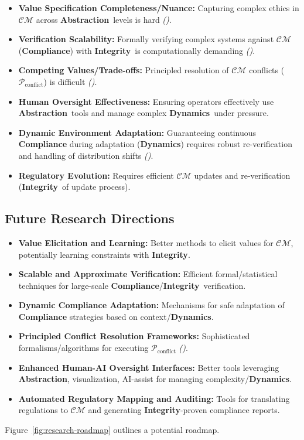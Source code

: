 \documentclass[12pt,a4paper]{report}
\renewcommand{\citep}[1]{\textit{\scriptsize{(\cite{#1})}}}
\newcommand{\Integrity}{\textbf{Integrity}}
\newcommand{\Abstraction}{\textbf{Abstraction}}
\newcommand{\Dynamics}{\textbf{Dynamics}}
\begin{document}
	\begin{itemize}
		\item \textbf{Value Specification Completeness/Nuance:} Capturing complex ethics in $\mathcal{CM}$ across \Abstraction\ levels is hard \citep{Kovac2025SpecGaming}.
		\item \textbf{Verification Scalability:} Formally verifying complex systems against $\mathcal{CM}$ (\textbf{Compliance}) with \Integrity\ is computationally demanding \citep{Peng2025ZKMLSurvey}.
		\item \textbf{Competing Values/Trade-offs:} Principled resolution of $\mathcal{CM}$ conflicts ($\mathcal{P}_{\text{conflict}}$) is difficult \citep{Sekrst2024Guardrails}.
		\item \textbf{Human Oversight Effectiveness:} Ensuring operators effectively use \Abstraction\ tools and manage complex \Dynamics\ under pressure.
		\item \textbf{Dynamic Environment Adaptation:} Guaranteeing continuous \textbf{Compliance} during adaptation (\Dynamics) requires robust re-verification and handling of distribution shifts \citep{AdditionalCitationRef53}.
		\item \textbf{Regulatory Evolution:} Requires efficient $\mathcal{CM}$ updates and re-verification (\Integrity\ of update process).
	\end{itemize}
	
	\subsection{Future Research Directions} %
	\label{sec:5-8-2} %
	
	\begin{itemize}
		\item \textbf{Value Elicitation and Learning:} Better methods to elicit values for $\mathcal{CM}$, potentially learning constraints with \Integrity.
		\item \textbf{Scalable and Approximate Verification:} Efficient formal/statistical techniques for large-scale \textbf{Compliance}/\Integrity\ verification.
		\item \textbf{Dynamic Compliance Adaptation:} Mechanisms for safe adaptation of \textbf{Compliance} strategies based on context/\Dynamics.
		\item \textbf{Principled Conflict Resolution Frameworks:} Sophisticated formalisms/algorithms for executing $\mathcal{P}_{\text{conflict}}$ \citep{Sekrst2024Guardrails}.
		\item \textbf{Enhanced Human-AI Oversight Interfaces:} Better tools leveraging \Abstraction, visualization, AI-assist for managing complexity/\Dynamics.
		\item \textbf{Automated Regulatory Mapping and Auditing:} Tools for translating regulations to $\mathcal{CM}$ and generating \Integrity-proven compliance reports.
	\end{itemize}
	Figure~\ref{fig:research-roadmap} outlines a potential roadmap.
	
\end{document}
